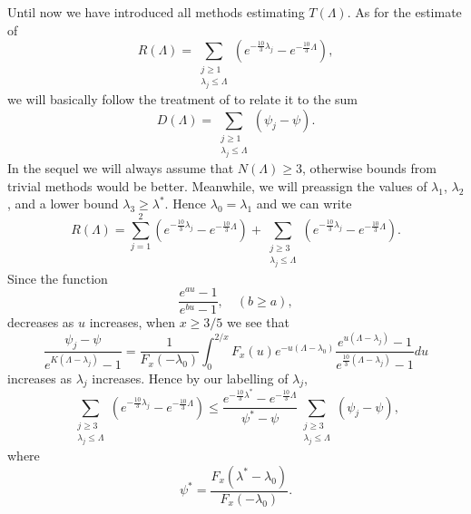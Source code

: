 \documentclass[10pt, reqno]{amsart}
\numberwithin{equation}{section}
\begin{document}
Until now we have introduced all methods estimating $T(\Lambda)$. As for the estimate of
\begin{equation}\label{eq:R}
R(\Lambda)=\sum_{\substack{j\geq 1\\\lambda_{j}\leq \Lambda}}(e^{-\frac{10}{3}\lambda_{j}}-e^{-\frac{10}{3}\Lambda}),
\end{equation}
we will basically follow the treatment of \cite{Pintz2018} to relate it to the sum
\begin{equation}\label{eq:D2}
D(\Lambda)= \sum_{\substack{j\geq 1\\\lambda_j\leq \Lambda}}(\psi_{j}-\psi).
\end{equation}
In the sequel we will always assume that $N(\Lambda)\geq 3$, otherwise bounds from trivial methods would be better. Meanwhile, we will preassign the values of $\lambda_1$, $\lambda_2$, and a lower bound $\lambda_3\geq \lambda^*$. Hence $\lambda_0=\lambda_1$ and we can write
\begin{equation}\label{eq:RDecomposition}
R(\Lambda)=\sum_{j=1}^2(e^{-\frac{10}{3}\lambda_{j}}-e^{-\frac{10}{3}\Lambda})+\sum_{\substack{j\geq 3\\\lambda_{j}\leq \Lambda}}(e^{-\frac{10}{3}\lambda_{j}}-e^{-\frac{10}{3}\Lambda}).
\end{equation}
Since the function
\begin{equation}\label{eq:Function}
\frac{e^{au}-1}{e^{bu}-1},\quad (b\geq a),
\end{equation}
decreases as $u$ increases, when $x\geq 3/5$ we see that
\begin{equation}\label{eq:Ratio}
\frac{\psi_j-\psi}{e^{K(\Lambda-\lambda_j)}-1}=\frac{1}{F_x(-\lambda_0)}\int_0^{2/x}F_x(u) e^{-u(\Lambda-\lambda_0)}\frac{e^{u(\Lambda-\lambda_j)}-1}{e^{\frac{10}{3}(\Lambda-\lambda_j)}-1}du
\end{equation}
increases as $\lambda_j$ increases. Hence by our labelling of $\lambda_j$,
\begin{equation}\label{eq:SumBound2}
\sum_{\substack{j\geq 3\\\lambda_{j}\leq \Lambda}}(e^{-\frac{10}{3}\lambda_{j}}-e^{-\frac{10}{3}\Lambda})\leq \frac{e^{-\frac{10}{3}\lambda^*}-e^{-\frac{10}{3}\Lambda}}{\psi^*-\psi}\sum_{\substack{j\geq 3\\\lambda_{j}\leq \Lambda}}(\psi_j-\psi),
\end{equation}
where
\begin{equation}\label{eq:psiStar}
\psi^*=\frac{F_x(\lambda^*-\lambda_0)}{F_x(-\lambda_0)}.
\end{equation}
\end{document}

